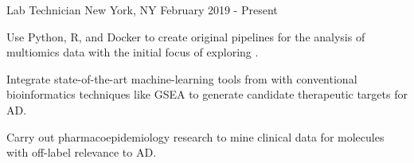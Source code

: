 %
%
%

\vspace*{0.35cm}

\begin{cventries}

    {Lab Technician}
    {New York, NY}
    {February 2019 - Present}
    {\begin{cvitems}
        \item{Use Python, R, and Docker to create original pipelines for the analysis of
            multiomics data with the initial focus of exploring .\vspace*{0.1cm}}
        \item{Integrate state-of-the-art machine-learning tools from  with
            conventional bioinformatics techniques like GSEA to generate candidate
            therapeutic targets for AD.\vspace*{0.1cm}}
        \item{Carry out pharmacoepidemiology research to mine clinical data
            for molecules with off-label relevance to AD.}
    \end{cvitems}}
    \vspace*{0.2cm}


\end{cventries}
